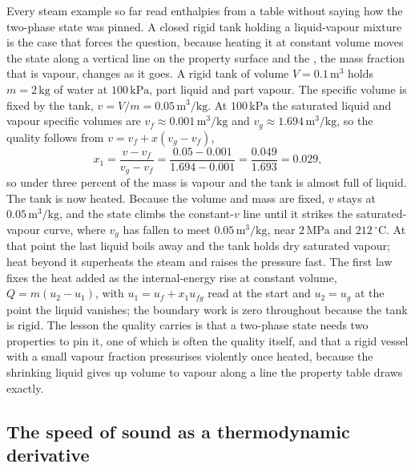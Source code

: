 Every steam example so far read enthalpies from a table without saying how the
two-phase state was pinned. A closed rigid tank holding a liquid-vapour mixture is
the case that forces the question, because heating it at constant volume moves the
state along a vertical line on the property surface and the , the
mass fraction that is vapour, changes as it goes. A rigid tank of volume
$V = 0.1\,\text{m}^3$ holds $m = 2\,\text{kg}$ of water at $100\,\text{kPa}$,
part liquid and part vapour. The specific volume is fixed by the tank,
$v = V/m = 0.05\,\text{m}^3/\text{kg}$. At $100\,\text{kPa}$ the saturated liquid
and vapour specific volumes are $v_f \approx 0.001\,\text{m}^3/\text{kg}$ and
$v_g \approx 1.694\,\text{m}^3/\text{kg}$, so the quality follows from
$v = v_f + x(v_g - v_f)$,
\[
x_1 = \frac{v - v_f}{v_g - v_f} = \frac{0.05 - 0.001}{1.694 - 0.001} =
\frac{0.049}{1.693} = 0.029,
\]
so under three percent of the mass is vapour and the tank is almost full of liquid.
The tank is now heated. Because the volume and mass are fixed, $v$ stays at
$0.05\,\text{m}^3/\text{kg}$, and the state climbs the constant-$v$ line until it
strikes the saturated-vapour curve, where $v_g$ has fallen to meet
$0.05\,\text{m}^3/\text{kg}$, near $2\,\text{MPa}$ and $212\,^{\circ}\mathrm{C}$.
At that point the last liquid boils away and the tank holds dry saturated vapour;
heat beyond it superheats the steam and raises the pressure fast. The first law
fixes the heat added as the internal-energy rise at constant volume,
$Q = m(u_2 - u_1)$, with $u_1 = u_f + x_1 u_{fg}$ read at the start and $u_2 = u_g$
at the point the liquid vanishes; the boundary work is zero throughout because the
tank is rigid. The lesson the quality carries is that a two-phase state needs two
properties to pin it, one of which is often the quality itself, and that a rigid
vessel with a small vapour fraction pressurises violently once heated, because the
shrinking liquid gives up volume to vapour along a line the property table draws
exactly.

\subsection{The speed of sound as a thermodynamic derivative}


